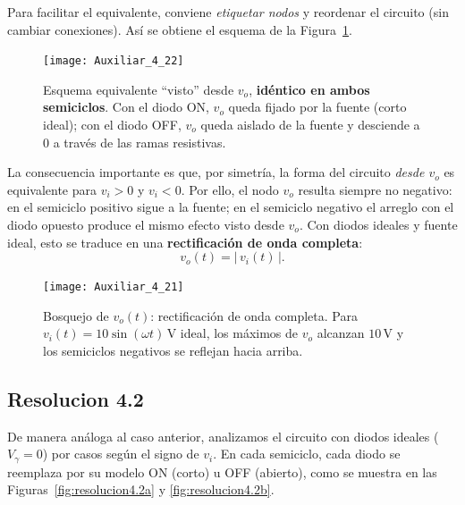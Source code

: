 \documentclass[
  11pt,
  letterpaper,
   addpoints,
   answers
  ]{exam}
\begin{document}
\begin{questions}
\begin{solution}
Para facilitar el equivalente, conviene \emph{etiquetar nodos} y reordenar el circuito (sin cambiar conexiones). Así se obtiene el esquema de la Figura~\ref{fig:equivalente-vo}.

\begin{figure}[H]
  \centering
  \texttt{[image: Auxiliar\_4\_22]}
  \caption{Esquema equivalente “visto” desde \(v_o\), \textbf{idéntico en ambos semiciclos}. Con el diodo ON, \(v_o\) queda fijado por la fuente (corto ideal); con el diodo OFF, \(v_o\) queda aislado de la fuente y desciende a \(0\) a través de las ramas resistivas.}
  \label{fig:equivalente-vo}
\end{figure}

La consecuencia importante es que, por simetría, la forma del circuito \emph{desde \(v_o\)} es equivalente para \(v_i>0\) y \(v_i<0\). Por ello, el nodo \(v_o\) resulta siempre no negativo: en el semiciclo positivo sigue a la fuente; en el semiciclo negativo el arreglo con el diodo opuesto produce el mismo efecto visto desde \(v_o\). Con diodos ideales y fuente ideal, esto se traduce en una \textbf{rectificación de onda completa}:
\[
v_o(t)=|\,v_i(t)\,|.
\]

\begin{figure}[H]
  \centering
  \texttt{[image: Auxiliar\_4\_21]}
  \caption{Bosquejo de \(v_o(t)\): rectificación de onda completa. Para \(v_i(t)=10\sin(\omega t)\,\text{V}\) ideal, los máximos de \(v_o\) alcanzan \(10\,\text{V}\) y los semiciclos negativos se reflejan hacia arriba.}
  \label{fig:voltaje-salida-4.1}
\end{figure}


    \subsection*{Resolucion 4.2}
  De manera análoga al caso anterior, analizamos el circuito con diodos ideales (\(V_\gamma=0\)) por casos según el signo de \(v_i\). En cada semiciclo, cada diodo se reemplaza por su modelo ON (corto) u OFF (abierto), como se muestra en las Figuras~\ref{fig:resolucion4.2a} y \ref{fig:resolucion4.2b}.


\end{solution}
\end{questions}
\end{document}
